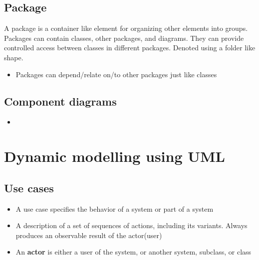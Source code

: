\documentclass[12pt]{book}
\begin{document}
\subsection*{Package}
A package is a container like element for organizing other elements into groups. Packages can contain classes, other packages, and diagrams. They can provide controlled access between classes in different packages. Denoted using a folder like shape.

\begin{itemize}
    \item Packages can depend/relate on/to other packages just like classes
\end{itemize}

\subsection*{Component diagrams}

\begin{itemize}
    \item 
\end{itemize}

\section*{Dynamic modelling using UML}

\subsection*{Use cases}
\begin{itemize}
    \item A use case specifies the behavior of a system or part of a system
    \item A description of a set of sequences of actions, including its variants. Always  produces an observable result of the actor(user)
    \item An \textbf{actor} is either a user of the system, or another system, subclass, or class
\end{itemize}
\end{document}
